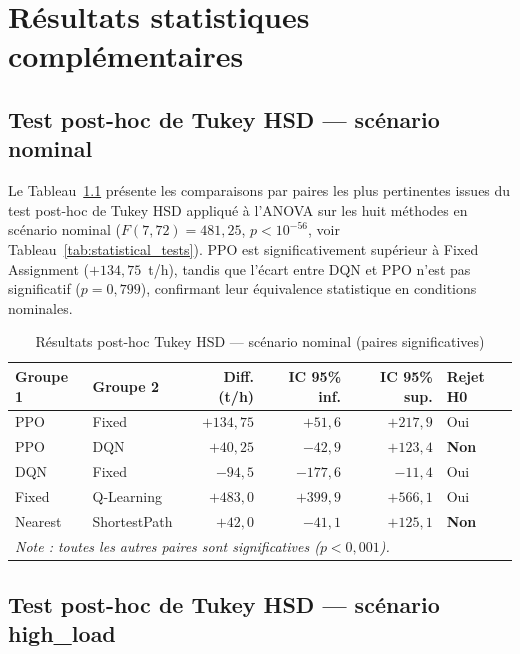 \documentclass[11pt,a4paper]{report}
\begin{document}
\chapter{Résultats statistiques complémentaires}
\label{ann:stats}

\section*{Test post-hoc de Tukey HSD — scénario nominal}

Le Tableau~\ref{tab:tukey-nominal} présente les comparaisons par paires
les plus pertinentes issues du test post-hoc de Tukey HSD appliqué à
l'ANOVA sur les huit méthodes en scénario nominal
($F(7,72) = 481{,}25$, $p < 10^{-56}$, voir Tableau~\ref{tab:statistical_tests}).
PPO est significativement supérieur à Fixed Assignment
($+134{,}75$~t/h), tandis que l'écart entre DQN et PPO n'est pas
significatif ($p = 0{,}799$), confirmant leur équivalence statistique
en conditions nominales.

\begin{table}[H]
\centering
\caption{Résultats post-hoc Tukey HSD — scénario nominal (paires significatives)}
\label{tab:tukey-nominal}
\small
\begin{tabular}{llrrrl}
\toprule
\textbf{Groupe 1} & \textbf{Groupe 2} & \textbf{Diff. (t/h)} & \textbf{IC 95\% inf.} & \textbf{IC 95\% sup.} & \textbf{Rejet H0} \\
\midrule
PPO   & Fixed      & $+134{,}75$ & $+51{,}6$  & $+217{,}9$ & Oui \\
PPO   & DQN        & $+40{,}25$  & $-42{,}9$  & $+123{,}4$ & \textbf{Non} \\
DQN   & Fixed      & $-94{,}5$   & $-177{,}6$ & $-11{,}4$  & Oui \\
Fixed & Q-Learning & $+483{,}0$  & $+399{,}9$ & $+566{,}1$ & Oui \\
Nearest & ShortestPath & $+42{,}0$ & $-41{,}1$ & $+125{,}1$ & \textbf{Non} \\
\midrule
\multicolumn{6}{l}{\textit{Note : toutes les autres paires sont significatives ($p < 0{,}001$).}} \\
\bottomrule
\end{tabular}
\end{table}

\section*{Test post-hoc de Tukey HSD — scénario high\_load}
\end{document}
